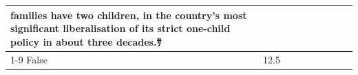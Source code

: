 \begin{table}[H]
\begin{tabular}{lllrlllll}
families have two children, in the country's most significant liberalisation of its strict one-child policy in about three decades.ｻ \\
\cline{1-9}
False & 12.5%
\end{tabular}
\end{table}
